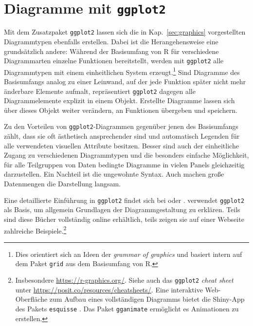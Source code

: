 \chapter{Diagramme mit \texttt{ggplot2}}
\label{sec:ggplot}

Mit dem Zusatzpaket \lstinline!ggplot2! lassen sich die in Kap.\ \ref{sec:graphics} vorgestellten Diagrammtypen ebenfalls erstellen. Dabei ist die Herangehensweise eine grundsätzlich andere: Während der Basisumfang von R für verschiedene Diagrammarten einzelne Funktionen bereitstellt, werden mit \lstinline!ggplot2! alle Diagrammtypen mit einem einheitlichen System erzeugt.\footnote{Dies orientiert sich an Ideen der \emph{grammar of graphics} \cite{Wilkinson2005} und basiert intern auf dem Paket  \lstinline!grid! aus dem Basisumfang von R.} Sind Diagramme des Basisumfangs analog zu einer Leinwand, auf der jede Funktion später nicht mehr änderbare Elemente aufmalt, repräsentiert \lstinline!ggplot2! dagegen alle Diagrammelemente explizit in einem Objekt. Erstellte Diagramme lassen sich über dieses Objekt weiter verändern, an Funktionen übergeben und speichern.

Zu den Vorteilen von \lstinline!ggplot2!-Diagrammen gegenüber jenen des Basisumfangs zählt, dass sie oft ästhetisch ansprechender sind und automatisch Legenden für alle verwendeten visuellen Attribute besitzen. Besser sind auch der einheitliche Zugang zu verschiedenen Diagrammtypen und die besonders einfache Möglichkeit, für alle Teilgruppen von Daten bedingte Diagramme in vielen Panels gleichzeitig darzustellen. Ein Nachteil ist die ungewohnte Syntax. Auch machen große Datenmengen die Darstellung langsam.

Eine detaillierte Einführung in \lstinline!ggplot2! findet sich bei  oder .  verwendet \lstinline!ggplot2! als Basis, um allgemein Grundlagen der Diagrammgestaltung zu erklären. Teils sind diese Bücher vollständig online erhältlich, teils zeigen sie auf einer Webseite zahlreiche Beispiele.\footnote{Insbesondere \url{https://r-graphics.org/}. Siehe auch das \lstinline!ggplot2! \emph{cheat sheet} unter \url{https://posit.co/resources/cheatsheets/}. Eine interaktive Web-Oberfläche zum Aufbau eines vollständigen Diagramms bietet die Shiny-App des Pakets \lstinline!esquisse! \cite{Meyer2024}. Das Paket \lstinline!gganimate! \cite{Pedersen2018} ermöglicht es Animationen zu erstellen.}

